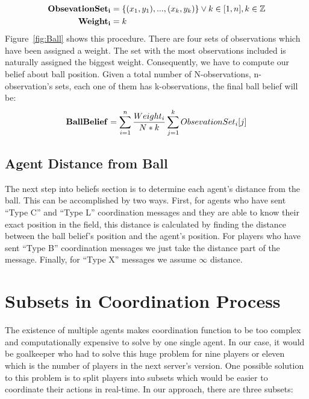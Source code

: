 \begin{align*}
{\bf Obsevation Set_{i} } &= \lbrace (x_{1},y_{1}),...,(x_{k},y_{k}) \rbrace \vee k \in [1,n] , k\in \mathbb{Z} \\
{\bf Weight_{i}} &= k
\end{align*}
Figure~\ref{fig:Ball} shows this procedure. There are four sets of observations which have been assigned a weight. The set with the most observations included is naturally assigned the biggest weight. Consequently, we have to compute our belief about ball position.
Given a total number of N-observations, n-observation's sets, each one of them has k-observations, the final ball belief will be:\\
\begin{align*}
{\bf Ball Belief} = \displaystyle\sum\limits_{i=1}^n \frac {Weight_{i}} {N \ast k}  \displaystyle\sum\limits_{j=1}^k Obsevation Set_{i}[j]
\end{align*}



\subsection{Agent Distance from Ball}
The next step into beliefs section is to determine each agent's distance from the ball. This can be accomplished by two ways. First, for agents who have sent ``Type C'' and ``Type L'' coordination messages and they are able to know their exact position in the field, this distance is calculated by finding the distance between the ball belief's position and the agent's position. For players who have sent ``Type B'' coordination messages we just take the distance part of the message. Finally, for ``Type X'' messages we assume $\infty$ distance.


\section{Subsets in Coordination Process}
The existence of multiple agents makes coordination function to be too complex and computationally expensive to solve by one single agent. In our case, it would be goalkeeper who had to solve this huge problem for nine players or eleven which is the number of players in the next server's version. 
One possible solution to this problem is to split players into subsets which would be easier to coordinate their actions in real-time. In our approach, there are three subsets:

